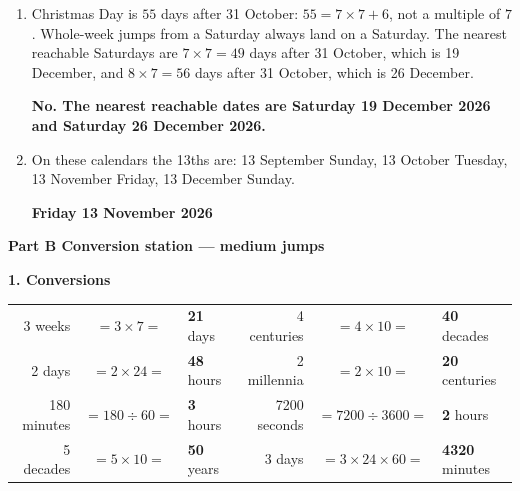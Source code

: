 \documentclass[11pt,a4paper]{article}
\newcommand{\banner}[1]{{\color{ttdark}\large\bfseries #1}\par\vspace{-4pt}{\color{ttdark}\rule{\linewidth}{1pt}}\par\vspace{2pt}}
\newcommand{\ans}[1]{\textcolor{ttaccent}{\bfseries #1}}
\begin{document}
\begin{enumerate}[label=\textbf{\arabic*.}, leftmargin=*, itemsep=6pt]
\item Christmas Day is $55$ days after 31 October:
$55=7\times7+6$, not a multiple of $7$. Whole-week jumps from a Saturday always land on a Saturday. The nearest reachable Saturdays are
$7\times7=49$ days after 31 October, which is 19 December, and
$8\times7=56$ days after 31 October, which is 26 December.

\ans{No. The nearest reachable dates are Saturday 19 December 2026 and Saturday 26 December 2026.}

\item On these calendars the 13ths are: 13 September Sunday, 13 October Tuesday, 13 November Friday, 13 December Sunday.

\ans{Friday 13 November 2026}
\end{enumerate}

\banner{Part B \quad Conversion station --- medium jumps}

\textbf{1. Conversions}

\begin{center}
\renewcommand{\arraystretch}{1.15}
\begin{tabular}{@{}rcl@{\qquad}rcl@{}}
3 weeks & $=3\times7=$ & \ans{21} days & 4 centuries & $=4\times10=$ & \ans{40} decades\\[2pt]
2 days & $=2\times24=$ & \ans{48} hours & 2 millennia & $=2\times10=$ & \ans{20} centuries\\[2pt]
180 minutes & $=180\div60=$ & \ans{3} hours & 7200 seconds & $=7200\div3600=$ & \ans{2} hours\\[2pt]
5 decades & $=5\times10=$ & \ans{50} years & 3 days & $=3\times24\times60=$ & \ans{4320} minutes
\end{tabular}
\end{center}
\end{document}
